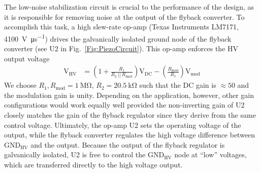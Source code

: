 \documentclass[aip,rsi,reprint]{revtex4-1} %
\begin{document}
The low-noise stabilization circuit is crucial to the performance of the design, as it is responsible for removing noise at the output of the flyback converter.
To accomplish this task, a high slew-rate op-amp (Texas Instruments LM7171, \SI{4100}{\volt\per\micro\second}) drives the galvanically isolated ground node of the flyback converter (see U2 in Fig.~\ref{Fig:PiezoCircuit}).
This op-amp enforces the HV output voltage
\begin{align}
\text{V}_\text{HV} &= \left(1 + \frac{R_1}{R_2~||~R_\text{mod}}\right) \text{V}_\text{DC} -
\left(\frac{R_\text{mod}}{R_1}\right) \text{V}_\text{mod}
\end{align}
We choose $R_1, R_\text{mod} = \SI{1}{\mega\ohm}$, $R_2 = \SI{20.5}{\kilo\ohm}$ such that the DC gain is $\approx 50$ and the modulation gain is unity.
Depending on the application, however, other gain configurations would work equally well provided the non-inverting gain of U2 closely matches the gain of the flyback regulator since they derive from the same control voltage.
Ultimately, the op-amp U2 sets the operating voltage of the output, while the flyback converter regulates the high voltage difference between $\text{GND}_\text{HV}$ and the output.
Because the output of the flyback regulator is galvanically isolated, U2 is free to control the $\text{GND}_\text{HV}$ node at ``low'' voltages, which are transferred directly to the high voltage output.




\end{document}
